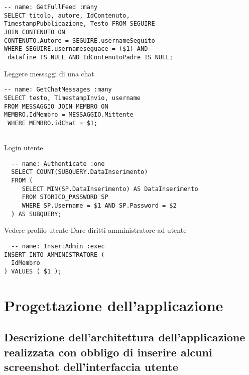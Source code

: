 \documentclass[a4paper,12pt]{report}
\begin{document}
\begin{lstlisting}
-- name: GetFullFeed :many
SELECT titolo, autore, IdContenuto, 
TimestampPubblicazione, Testo FROM SEGUIRE 
JOIN CONTENUTO ON 
CONTENUTO.Autore = SEGUIRE.usernameSeguito  
WHERE SEGUIRE.usernameseguace = ($1) AND
 datafine IS NULL AND IdContenutoPadre IS NULL;
\end{lstlisting}

Leggere messaggi di una chat
\begin{lstlisting}
-- name: GetChatMessages :many
SELECT testo, TimestampInvio, username 
FROM MESSAGGIO JOIN MEMBRO ON 
MEMBRO.IdMembro = MESSAGGIO.Mittente
 WHERE MEMBRO.idChat = $1;
 
\end{lstlisting}

Login utente
\begin{lstlisting}
  -- name: Authenticate :one
  SELECT COUNT(SUBQUERY.DataInserimento)
  FROM (
     SELECT MIN(SP.DataInserimento) AS DataInserimento
     FROM STORICO_PASSWORD SP 
     WHERE SP.Username = $1 AND SP.Password = $2
  ) AS SUBQUERY;
\end{lstlisting}

Vedere profilo utente
Dare diritti amministratore ad utente
\begin{lstlisting}
  -- name: InsertAdmin :exec
INSERT INTO AMMINISTRATORE (
  IdMembro
) VALUES ( $1 );
\end{lstlisting}

\chapter{Progettazione dell'applicazione}
\section{Descrizione dell'architettura dell'applicazione realizzata con obbligo di inserire alcuni screenshot dell'interfaccia utente}
\end{document}
